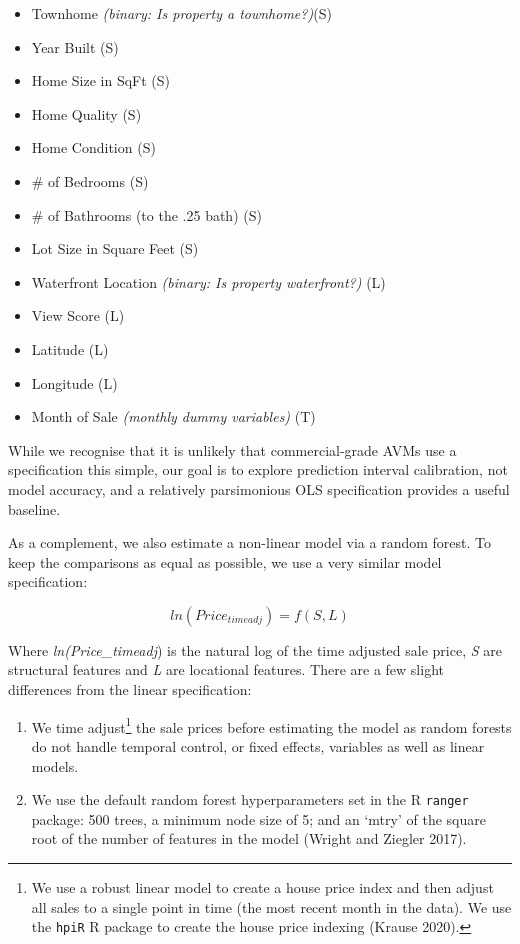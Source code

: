 \documentclass[colTwo]{anon}
\theoremstyle{definition}
\begin{document}
\begin{itemize}
\item Townhome \textit{(binary: Is property a townhome?)}(S)
\item Year Built (S)
\item Home Size in SqFt (S)
\item Home Quality (S)
\item Home Condition (S)
\item \# of Bedrooms (S)
\item \# of Bathrooms (to the .25 bath) (S)
\item Lot Size in Square Feet (S)
\item Waterfront Location \textit{(binary: Is property waterfront?)} (L)
\item View Score (L)
\item Latitude (L)
\item Longitude (L)
\item Month of Sale \textit{(monthly dummy variables)} (T) 
\end{itemize}

While we recognise that it is unlikely that commercial-grade AVMs use a specification this simple, our goal is to explore prediction interval calibration, not model accuracy, and a relatively parsimonious OLS specification provides a useful baseline.  

As a complement, we also estimate a non-linear model via a random forest.  To keep the comparisons as equal as possible, we use a very similar model specification:

\[ln(Price_{timeadj}) = f(S, L) \]

Where \textit{ln(Price\_timeadj}) is the natural log of the time adjusted sale price, \textit{S} are structural features and \textit{L} are locational features. There are a few slight differences from the linear specification:

\begin{enumerate}
\item We time adjust\footnote{We use a robust linear model to create a house price index and then adjust all sales to a single point in time (the most recent month in the data).  We use the \texttt{hpiR} R package to create the house price indexing (Krause 2020).} the sale prices before estimating the model as random forests do not handle temporal control, or fixed effects, variables as well as linear models. 
\item We use the default random forest hyperparameters set in the R \texttt{ranger} package: 500 trees, a minimum node size of 5; and an ‘mtry’ of the square root of the number of features in the model (Wright and Ziegler 2017). 
\end{enumerate}
\end{document}
